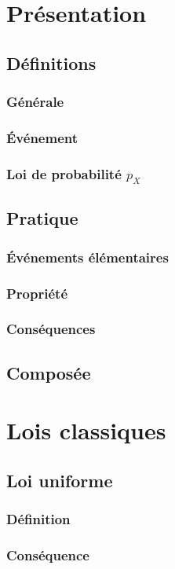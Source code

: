 \documentclass[12pt,a4paper,french]{book}
\begin{document}
	\section{Présentation}
		\subsection{Définitions}
			\subsubsection{Générale}
			\subsubsection{Événement}
			\subsubsection{Loi de probabilité $p_X$}
		\subsection{Pratique}
			\subsubsection{Événements élémentaires}
			\subsubsection{Propriété}
			\subsubsection{Conséquences}
		\subsection{Composée}
	\section{Lois classiques}
		\subsection{Loi uniforme}
			\subsubsection{Définition}
			\subsubsection{Conséquence}
\end{document}

